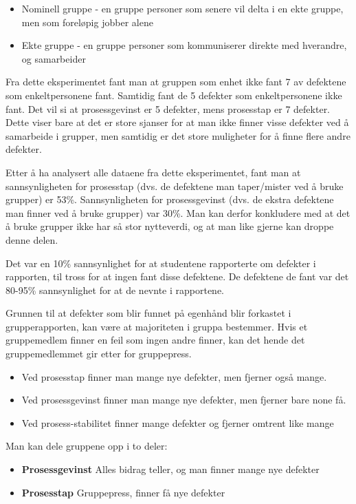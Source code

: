 \begin{itemize}
\item
  Nominell gruppe - en gruppe personer som senere vil delta i en ekte
  gruppe, men som foreløpig jobber alene
\item
  Ekte gruppe - en gruppe personer som kommuniserer direkte med
  hverandre, og samarbeider
\end{itemize}
Fra dette eksperimentet fant man at gruppen som enhet ikke fant 7 av
defektene som enkeltpersonene fant. Samtidig fant de 5 defekter som
enkeltpersonene ikke fant. Det vil si at prosessgevinst er 5 defekter,
mens prosesstap er 7 defekter. Dette viser bare at det er store sjanser
for at man ikke finner visse defekter ved å samarbeide i grupper, men
samtidig er det store muligheter for å finne flere andre defekter.

Etter å ha analysert alle dataene fra dette eksperimentet, fant man at
sannsynligheten for prosesstap (dvs. de defektene man taper/mister ved å
bruke grupper) er 53\%. Sannsynligheten for prosessgevinst (dvs. de
ekstra defektene man finner ved å bruke grupper) var 30\%. Man kan
derfor konkludere med at det å bruke grupper ikke har så stor
nytteverdi, og at man like gjerne kan droppe denne delen.

Det var en 10\% sannsynlighet for at studentene rapporterte om defekter
i rapporten, til tross for at ingen fant disse defektene. De defektene
de fant var det 80-95\% sannsynlighet for at de nevnte i rapportene.

Grunnen til at defekter som blir funnet på egenhånd blir forkastet i
grupperapporten, kan være at majoriteten i gruppa bestemmer. Hvis et
gruppemedlem finner en feil som ingen andre finner, kan det hende det
gruppemedlemmet gir etter for gruppepress.

\begin{itemize}
\item
  Ved prosesstap finner man mange nye defekter, men fjerner også mange.
\item
  Ved prosessgevinst finner man mange nye defekter, men fjerner bare
  none få.
\item
  Ved prosess-stabilitet finner mange defekter og fjerner omtrent like
  mange
\end{itemize}
Man kan dele gruppene opp i to deler:

\begin{itemize}
\item
  \textbf{Prosessgevinst} Alles bidrag teller, og man finner mange nye
  defekter
\item
  \textbf{Prosesstap} Gruppepress, finner få nye defekter
\end{itemize}

